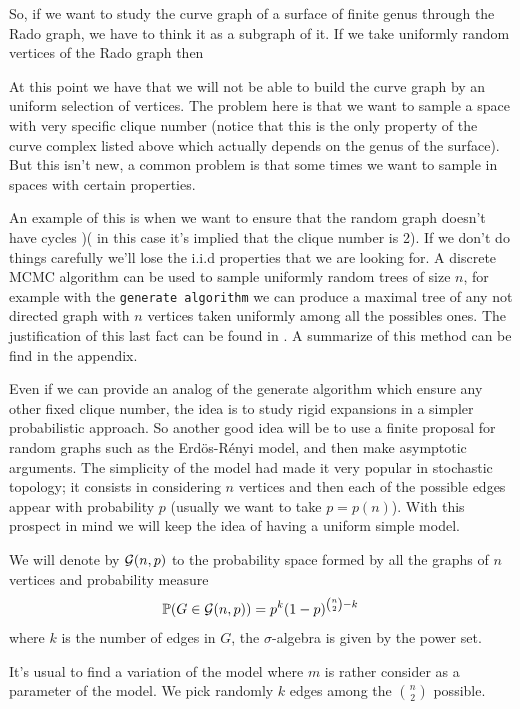 So, if we want to study the curve graph of a surface of finite genus through the Rado graph, we have to think it as a subgraph of it. If we take uniformly random vertices of the Rado graph then



At this point we have that we will not be able to build the curve graph by an uniform selection of vertices. The problem here is that we want to sample a space with very specific clique number (notice that this is the only property of the curve complex listed above which actually depends on the genus of the surface). But this isn't new, a common problem is that some times we want to sample in spaces with certain properties. 

An example of this is when we want to ensure that the random graph doesn't have cycles \cite{Alcazar15})( in this case it's implied that the clique number is 2). If we don't do things carefully we'll lose the i.i.d properties that we are looking for. A discrete MCMC algorithm can be used to sample uniformly random trees of size $n$, for example with the \texttt{generate algorithm} we can produce a maximal tree of any not directed graph with $n$ vertices taken uniformly among all the possibles ones. The justification of this last fact can be found in \cite{Broder89}. A summarize of this method can be find in the appendix.

Even if we can provide an analog of the generate algorithm which ensure any other fixed clique number, the idea is to study rigid expansions in a simpler probabilistic approach. So another good idea will be to use a finite proposal for random graphs such as the Erdös-Rényi model, and then make asymptotic arguments. The simplicity of the model had made it very popular in stochastic topology; it consists in considering $n$ vertices and then each of the possible edges appear with probability $p$ (usually we want to take $p=p(n)$). With this prospect in mind we will keep the idea of having a uniform simple model.

\begin{defini}
We will denote by $\mathcal{G}(n,p)$ to the probability space formed by all the graphs of $n$ vertices and probability measure 
$$ \mathbb{P}(G\in \mathcal{G}(n,p)) = p^{k} (1-p)^{\binom{n}{2}-k} $$
where $k$ is the number of edges in $G$, the $\sigma$-algebra is given by the power set.
\end{defini}

It's usual to find a variation of the model where $m$ is rather consider as a parameter of the model. We pick randomly $k$ edges among the $\binom{n}{2}$ possible. 

